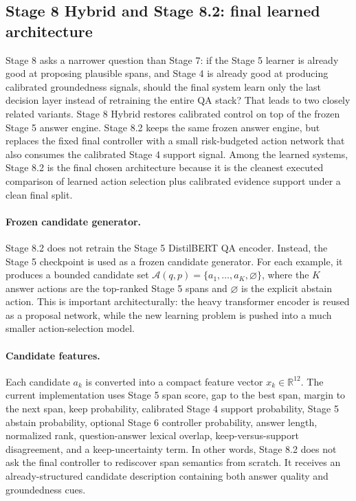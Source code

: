 \subsection{Stage 8 Hybrid and Stage 8.2: final learned architecture}

Stage 8 asks a narrower question than Stage 7:
if the Stage 5 learner is already good at proposing plausible spans, and
Stage 4 is already good at producing calibrated groundedness signals, should
the final system learn only the last decision layer instead of retraining the
entire QA stack?
That leads to two closely related variants.
Stage 8 Hybrid restores calibrated control on top of the frozen Stage 5 answer
engine.
Stage 8.2 keeps the same frozen answer engine, but replaces the fixed final
controller with a small risk-budgeted action network that also consumes the
calibrated Stage 4 support signal.
Among the learned systems, Stage 8.2 is the final chosen architecture because
it is the cleanest executed comparison of learned action selection plus
calibrated evidence support under a clean final split.

\paragraph{Frozen candidate generator.}
Stage 8.2 does not retrain the Stage 5 DistilBERT QA encoder.
Instead, the Stage 5 checkpoint is used as a frozen candidate generator.
For each example, it produces a bounded candidate set
\(\mathcal{A}(q,p)=\{a_1,\dots,a_K,\varnothing\}\),
where the \(K\) answer actions are the top-ranked Stage 5 spans and
\(\varnothing\) is the explicit abstain action.
This is important architecturally:
the heavy transformer encoder is reused as a proposal network, while the new
learning problem is pushed into a much smaller action-selection model.

\paragraph{Candidate features.}
Each candidate \(a_k\) is converted into a compact feature vector
\(x_k \in \mathbb{R}^{12}\).
The current implementation uses Stage 5 span score, gap to the best span,
margin to the next span, keep probability, calibrated Stage 4 support
probability, Stage 5 abstain probability, optional Stage 6 controller
probability, answer length, normalized rank, question-answer lexical overlap,
keep-versus-support disagreement, and a keep-uncertainty term.
In other words, Stage 8.2 does not ask the final controller to rediscover span
semantics from scratch.
It receives an already-structured candidate description containing both answer
quality and groundedness cues.

